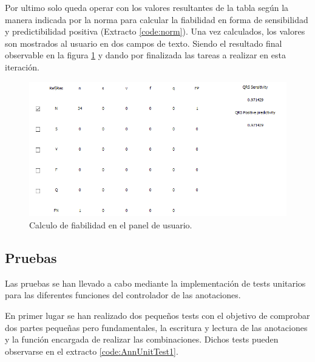         
    Por ultimo solo queda operar con los valores resultantes de la tabla según la manera indicada por la norma para calcular la fiabilidad en forma de sensibilidad y predictibilidad positiva (Extracto \ref{code:norm}). Una vez calculados, los valores son mostrados al usuario en dos campos de texto. Siendo el resultado final observable en la figura \ref{fig:fiability} y dando por finalizada las tareas a realizar en esta iteración.
        
        
    \begin{figure}[H]
            \centering
                    \includegraphics[width = \linewidth]{figuras/fiabilidad.PNG}
            \caption{Calculo de fiabilidad en el panel de usuario.}
            \label{fig:fiability}
    \end{figure}
        
    \subsection{Pruebas}
    
    Las pruebas se han llevado a cabo mediante la implementación de tests unitarios para las diferentes funciones del controlador de las anotaciones. 
    
    En primer lugar se han realizado dos pequeños tests con el objetivo de comprobar dos partes pequeñas pero fundamentales, la escritura y lectura de las anotaciones y la función encargada de realizar las combinaciones. Dichos tests pueden observarse en el extracto \ref{code:AnnUnitTest1}.
    
    
